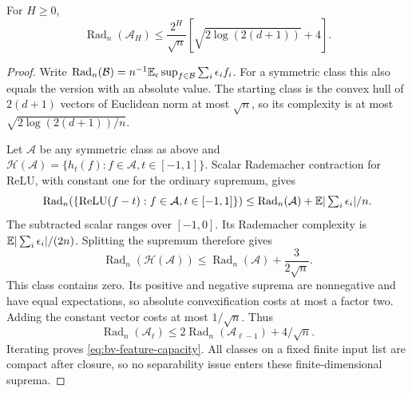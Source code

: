 \begin{lemma}
\label{lem:bv-feature-capacity}
For $H\ge0$,
\begin{equation}
 \operatorname{Rad}_n(\mathcal A_H)
 \le\frac{2^H}{\sqrt n}
       \left[\sqrt{2\log(2(d+1))}+4\right].
 \label{eq:bv-feature-capacity}
\end{equation}
\end{lemma}
\begin{proof}
Write $\operatorname{Rad}_n(\mathcal B)=n^{-1}\mathbb E_\epsilon\sup_{f\in\mathcal B}\sum_i\epsilon_if_i$. For a symmetric class this also equals the version with an absolute value. The starting class is the convex hull of $2(d+1)$ vectors of Euclidean norm at most $\sqrt n$, so its complexity is at most $\sqrt{2\log(2(d+1))/n}$.

Let $\mathcal A$ be any symmetric class as above and $\mathcal H(\mathcal A)=\{h_t(f):f\in\mathcal A,t\in[-1,1]\}$. Scalar Rademacher contraction for ReLU, with constant one for the ordinary supremum, gives
\[
 \operatorname{Rad}_n(\{\operatorname{ReLU}(f-t):f\in\mathcal A,t\in[-1,1]\})
 \le\operatorname{Rad}_n(\mathcal A)+\mathbb E|\textstyle\sum_i\epsilon_i|/n.
\]
The subtracted scalar ranges over $[-1,0]$. Its Rademacher complexity is $\mathbb E|\sum_i\epsilon_i|/(2n)$. Splitting the supremum therefore gives
\[
 \operatorname{Rad}_n(\mathcal H(\mathcal A))
 \le\operatorname{Rad}_n(\mathcal A)+\frac3{2\sqrt n}.
\]
This class contains zero. Its positive and negative suprema are nonnegative and have equal expectations, so absolute convexification costs at most a factor two. Adding the constant vector costs at most $1/\sqrt n$. Thus
\[
 \operatorname{Rad}_n(\mathcal A_\ell)
 \le2\operatorname{Rad}_n(\mathcal A_{\ell-1})+4/\sqrt n.
\]
Iterating proves \eqref{eq:bv-feature-capacity}. All classes on a fixed finite input list are compact after closure, so no separability issue enters these finite-dimensional suprema.
\end{proof}

